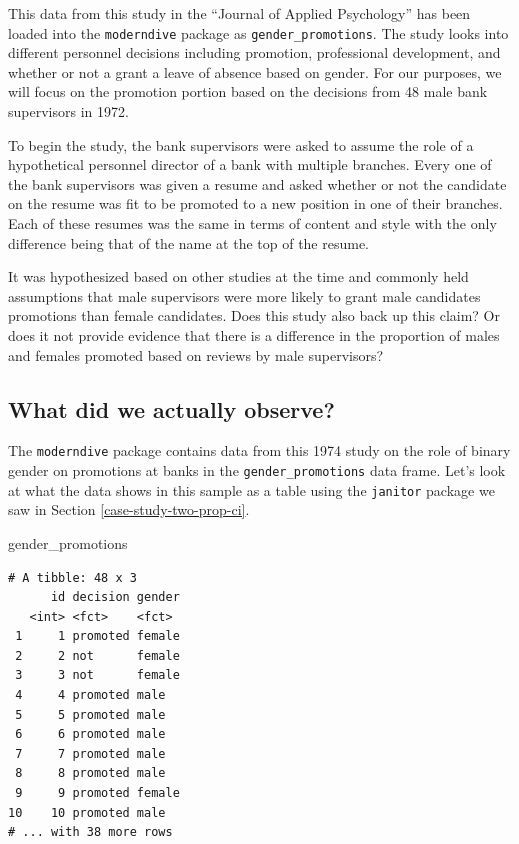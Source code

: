 \documentclass[12pt, krantz2,]{krantz}
\makeatletter
\newenvironment{Shaded}{\begin{snugshade}}{\end{snugshade}}
\newcommand{\NormalTok}[1]{#1}
\newenvironment{kframe}{%
\medskip{}
\setlength{\fboxsep}{.8em}
 \def\at@end@of@kframe{}%
 \ifinner\ifhmode%
  \def\at@end@of@kframe{\end{minipage}}%
  \begin{minipage}{\columnwidth}%
 \fi\fi%
 \def\FrameCommand##1{\hskip\@totalleftmargin \hskip-\fboxsep
 \colorbox{shadecolor}{##1}\hskip-\fboxsep
     \hskip-\linewidth \hskip-\@totalleftmargin \hskip\columnwidth}%
 \MakeFramed {\advance\hsize-\width
   \@totalleftmargin\z@ \linewidth\hsize
   \@setminipage}}%
 {\par\unskip\endMakeFramed%
 \at@end@of@kframe}
\renewenvironment{Shaded}{\begin{kframe}}{\end{kframe}}
\makeatother
\begin{document}
This data from this study in the ``Journal of Applied Psychology'' has been loaded into the \texttt{moderndive} package as \texttt{gender\_promotions}. The study looks into different personnel decisions including promotion, professional development, and whether or not a grant a leave of absence based on gender. For our purposes, we will focus on the promotion portion based on the decisions from 48 male bank supervisors in 1972.

To begin the study, the bank supervisors were asked to assume the role of a hypothetical personnel director of a bank with multiple branches. Every one of the bank supervisors was given a resume and asked whether or not the candidate on the resume was fit to be promoted to a new position in one of their branches. Each of these resumes was the same in terms of content and style with the only difference being that of the name at the top of the resume.

It was hypothesized based on other studies at the time and commonly held assumptions that male supervisors were more likely to grant male candidates promotions than female candidates. Does this study also back up this claim? Or does it not provide evidence that there is a difference in the proportion of males and females promoted based on reviews by male supervisors?

\hypertarget{what-did-we-actually-observe}{%
\subsection{What did we actually observe?}\label{what-did-we-actually-observe}}

The \texttt{moderndive} package contains data from this 1974 study on the role of binary gender on promotions at banks in the \texttt{gender\_promotions} data frame. Let's look at what the data shows in this sample as a table using the \texttt{janitor} package we saw in Section \ref{case-study-two-prop-ci}.

\begin{Shaded}
\begin{Highlighting}[]
\NormalTok{gender_promotions}
\end{Highlighting}
\end{Shaded}

\begin{verbatim}
# A tibble: 48 x 3
      id decision gender
   <int> <fct>    <fct> 
 1     1 promoted female
 2     2 not      female
 3     3 not      female
 4     4 promoted male  
 5     5 promoted male  
 6     6 promoted male  
 7     7 promoted male  
 8     8 promoted male  
 9     9 promoted female
10    10 promoted male  
# ... with 38 more rows
\end{verbatim}
\end{document}
